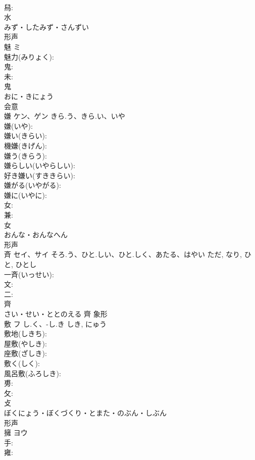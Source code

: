 \documentclass[8pt]{extreport}
\begin{document}
\begin{CJK}{UTF8}{min}
\\	舄: 
\\	水	
\\	みず・したみず・さんずい	
\\	形声 
\\	魅	ミ			
\\	魅力(みりょく): 
\\	鬼: 
\\	未: 
\\	鬼	
\\	おに・きにょう	
\\	会意 
\\	嫌	ケン、ゲン	きら.う、きら.い、いや		
\\	嫌(いや): 
\\	嫌い(きらい): 
\\	機嫌(きげん): 
\\	嫌う(きらう): 
\\	嫌らしい(いやらしい): 
\\	好き嫌い(すききらい): 
\\	嫌がる(いやがる): 
\\	嫌に(いやに): 
\\	女: 
\\	兼: 
\\	女	
\\	おんな・おんなへん	
\\	形声 
\\	斉	セイ、サイ	そろ.う、ひと.しい、ひと.しく、あたる、はやい	ただ, なり, ひと, ひとし	
\\	一斉(いっせい): 
\\	文: 
\\	二: 
\\	齊	
\\	さい・せい・ととのえる	齊	象形 
\\	敷	フ	し.く、-し.き	しき, にゅう	
\\	敷地(しきち): 
\\	屋敷(やしき): 
\\	座敷(ざしき): 
\\	敷く(しく): 
\\	風呂敷(ふろしき): 
\\	旉: 
\\	攵: 
\\	攴	
\\	ぼくにょう・ぼくづくり・とまた・のぶん・しぶん	
\\	形声 
\\	擁	ヨウ			
\\	手: 
\\	雍: 

\end{CJK}
\end{document}
